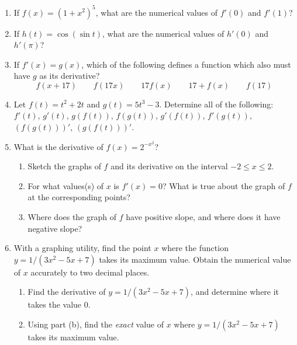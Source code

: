 \begin{enumerate}
\item If $f(x) = (1 + x^2)^5$, what are the numerical values of $f'(0)$
and $f'(1)$?



\item If $h(t) = \cos(\sin{t})$, what are the numerical values of
$h'(0)$ and $h'(\pi)$?



\item If $f'(x) = g(x)$, which of the following defines a function
which also must have $g$ as its derivative?
	\[
f(x+17) \qquad f(17x) \qquad 17f(x) \qquad 17+f(x)
		\qquad f(17)
\]



\item Let $f(t) = t^2 + 2t$ and $g(t) = 5t^3 - 3$.  Determine all of
the following: $f'(t)$, $g'(t)$, $g(f(t))$, $f(g(t))$, $g'(f(t))$,
$f'(g(t))$, $(f(g(t)))'$, $(g(f(t)))'$.



\item What is the derivative of $f(x) = 2^{-x^2}$?

  \begin{enumerate}
  \item Sketch the graphs of $f$ and its derivative on the interval $-2
\leq x \leq 2$.

  \item For what values(s) of $x$ is $f'(x) = 0$?  What is true about the
graph of $f$ at the corresponding points?

  \item Where does the graph of $f$ have positive slope, and where does
it have negative slope?



\end{enumerate}
\item With a graphing utility, find the point $x$ where the function
$y = 1/(3x^2 - 5x + 7)$ takes its maximum value.  Obtain the numerical
value of $x$ accurately to two decimal places.

  \begin{enumerate}
  \item Find the derivative of $y = 1/(3x^2 - 5x + 7)$, and determine
where it takes the value 0.



  \item Using part (b), find the {\em exact\/} value of $x$ where $y =
1/(3x^2 - 5x + 7)$ takes its maximum value.


\end{enumerate}
\end{enumerate}
